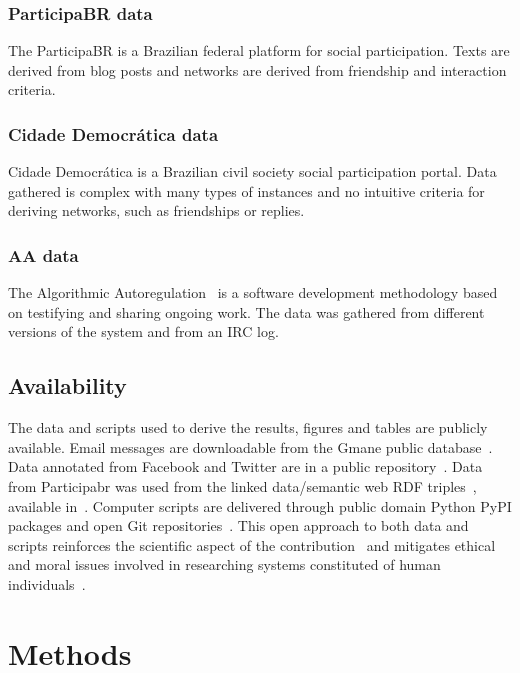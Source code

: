 \subsubsection{ParticipaBR data}
The ParticipaBR is a Brazilian federal platform for social participation.
Texts are derived from blog posts and networks are derived from
friendship and interaction criteria.

\subsubsection{Cidade Democr\'atica data}
Cidade Democr\'atica is a Brazilian civil society social participation portal.
Data gathered is complex with many types of instances and no intuitive criteria
for deriving networks, such as friendships or replies.

\subsubsection{AA data}
The Algorithmic Autoregulation~\cite{aa} is a software development
methodology based on testifying and sharing ongoing work.
The data was gathered from different versions of the system and from an IRC
log. 

\subsection{Availability}
The data and scripts used to derive the results, figures and tables are publicly available. Email messages are downloadable from the Gmane public database~\cite{Gmanewikipedia}.
Data annotated from Facebook and Twitter are in a public repository~\cite{fbtwData}.
Data from Participabr was used from the linked data/semantic web RDF triples~\cite{opa}, available in~\cite{datahub}.
Computer scripts are delivered through public domain Python PyPI packages and open Git repositories~\cite{gmanePack}.
This open approach to both data and scripts reinforces the scientific aspect of the contribution~\cite{openSci} and mitigates ethical and moral issues involved in researching systems constituted of human individuals~\cite{anPhy,ccs15}.
 
\section{Methods}\label{sec:carac}

